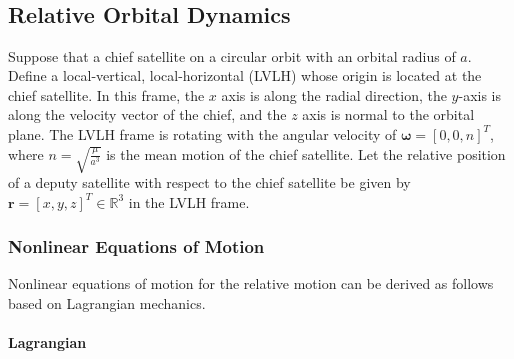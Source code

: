 \documentclass[10pt]{article}
\date{}
\renewcommand{\Re}{\ensuremath{\mathbb{R}}}
\begin{document}
\thispagestyle{empty}

\vspace*{0.1cm}\\
\vspace*{0.1cm}\\
\\
\\






\tableofcontents

\subsection{Relative Orbital Dynamics}\label{sec:PD}

Suppose that a chief satellite on a circular orbit with an orbital radius of $a$. Define a local-vertical, local-horizontal (LVLH) whose origin is located at the chief satellite. In this frame, the $x$ axis is along the radial direction, the $y$-axis is along the velocity vector of the chief, and the $z$ axis is normal to the orbital plane. The LVLH frame is rotating with the angular velocity of $\mathbf{\omega}=[0,0,n]^T$, where $n=\sqrt{\frac{\mu}{a^3}}$ is the mean motion of the chief satellite. Let the relative position of a deputy satellite with respect to the chief satellite be given by $\mathbf{r}=[x,y,z]^T\in\Re^3$ in the LVLH frame. 

\subsubsection{Nonlinear Equations of Motion}

Nonlinear equations of motion for the relative motion can be derived as follows based on Lagrangian mechanics. 

\paragraph{Lagrangian} 
\end{document}
